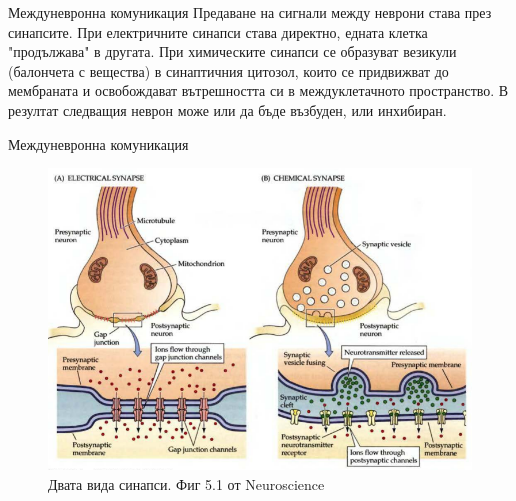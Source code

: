 \begin{frame}[t]{Междуневронна комуникация}
  Предаване на сигнали между неврони става през синапсите. 
  При електричните синапси става директно, едната клетка "продължава" в другата.
  При химическите синапси се образуват везикули (балончета с вещества) в синаптичния цитозол, 
  които се придвижват до мембраната и освобождават вътрешността си в междуклетачното пространство. 
  В резултат следващия неврон може или да бъде възбуден, или инхибиран.
\end{frame}

\begin{frame}[t]{Междуневронна комуникация}
  \begin{figure}[htbp!]
    \centering
    \includegraphics[width=\textwidth,height=0.7\textheight,keepaspectratio]{synapse-types.PNG}
    \caption{Двата вида синапси. Фиг 5.1 от Neuroscience}
  \end{figure}
\end{frame}


